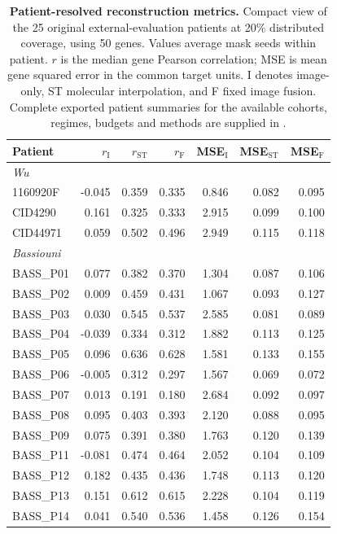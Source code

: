 \begin{table}[p]
\caption{\textbf{Patient-resolved reconstruction metrics.} Compact view of the 25 original external-evaluation patients at 20\% distributed coverage, using 50 genes. Values average mask seeds within patient. $r$ is the median gene Pearson correlation; MSE is mean gene squared error in the common target units. I denotes image-only, ST molecular interpolation, and F fixed image fusion. Complete exported patient summaries for the available cohorts, regimes, budgets and methods are supplied in \protect{}.}
\label{tab:patient_resolved_metrics}
\centering\small
\begin{tabular}{lrrrrrr}\toprule
Patient & $r_{\mathrm I}$ & $r_{\mathrm{ST}}$ & $r_{\mathrm F}$ & MSE$_{\mathrm I}$ & MSE$_{\mathrm{ST}}$ & MSE$_{\mathrm F}$\\\midrule
\multicolumn{7}{l}{\textit{Wu}}\\
1160920F & -0.045 & 0.359 & 0.335 & 0.846 & 0.082 & 0.095\\
CID4290 & 0.161 & 0.325 & 0.333 & 2.915 & 0.099 & 0.100\\
CID44971 & 0.059 & 0.502 & 0.496 & 2.949 & 0.115 & 0.118\\
\multicolumn{7}{l}{\textit{Bassiouni}}\\
BASS\_P01 & 0.077 & 0.382 & 0.370 & 1.304 & 0.087 & 0.106\\
BASS\_P02 & 0.009 & 0.459 & 0.431 & 1.067 & 0.093 & 0.127\\
BASS\_P03 & 0.030 & 0.545 & 0.537 & 2.585 & 0.081 & 0.089\\
BASS\_P04 & -0.039 & 0.334 & 0.312 & 1.882 & 0.113 & 0.125\\
BASS\_P05 & 0.096 & 0.636 & 0.628 & 1.581 & 0.133 & 0.155\\
BASS\_P06 & -0.005 & 0.312 & 0.297 & 1.567 & 0.069 & 0.072\\
BASS\_P07 & 0.013 & 0.191 & 0.180 & 2.684 & 0.092 & 0.097\\
BASS\_P08 & 0.095 & 0.403 & 0.393 & 2.120 & 0.088 & 0.095\\
BASS\_P09 & 0.075 & 0.391 & 0.380 & 1.763 & 0.120 & 0.139\\
BASS\_P11 & -0.081 & 0.474 & 0.464 & 2.052 & 0.104 & 0.109\\
BASS\_P12 & 0.182 & 0.435 & 0.436 & 1.748 & 0.113 & 0.120\\
BASS\_P13 & 0.151 & 0.612 & 0.615 & 2.228 & 0.104 & 0.119\\
BASS\_P14 & 0.041 & 0.540 & 0.536 & 1.458 & 0.126 & 0.154\\

\end{tabular}
\end{table}
